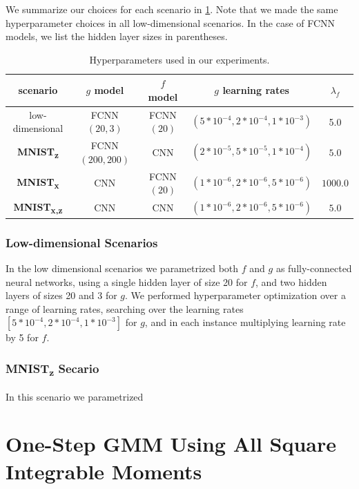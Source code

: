 \documentclass{article}
\theoremstyle{plain}
\theoremstyle{definition}
\newcommand\mnist[1]{\textbf{MNIST\textsubscript{#1}}}
\begin{document}
We summarize our choices for each scenario in \cref{tab:hyperparameters}. Note that we made the same hyperparameter choices in all low-dimensional scenarios. In the case of FCNN models, we list the hidden layer sizes in parentheses. 

\begin{table}
    \begin{tabular}{ccccc}
        \hline
        scenario & $g$ model & $f$ model & $g$ learning rates & $\lambda_f$ \\
        \hline
        low-dimensional & FCNN $(20,3)$ & FCNN $(20)$ & $(5 * 10^{-4}, 2 * 10^{-4}, 1 * 10^{-3})$ & 5.0 \\
        \mnist{z} & FCNN $(200,200)$ & CNN & $(2 * 10^{-5}, 5 * 10^{-5}, 1 * 10^{-4})$ & $5.0$ \\
        \mnist{x} & CNN & FCNN $(20)$ & $(1 * 10^{-6}, 2 * 10^{-6}, 5 * 10^{-6})$ & $1000.0$ \\
        \mnist{x,z} & CNN & CNN & $(1 * 10^{-6}, 2 * 10^{-6}, 5 * 10^{-6})$ & $5.0$ \\
        \hline
    \end{tabular}
    \caption{Hyperparameters used in our experiments.}
    \label{tab:hyperparameters}
\end{table}

\subsubsection{Low-dimensional Scenarios}

In the low dimensional scenarios we parametrized both $f$ and $g$ as fully-connected neural networks, using a single hidden layer of size 20 for $f$, and two hidden layers of sizes 20 and 3 for $g$. We performed hyperparameter optimization over a range of learning rates, searching over the learning rates $[5 * 10^{-4}, 2 * 10^{-4}, 1 * 10^{-3}]$ for $g$, and in each instance multiplying learning rate by 5 for $f$.

\subsubsection{\mnist{z} Secario}

In this scenario we parametrized 

\section{One-Step GMM Using All Square Integrable Moments}
\label{apx:gmm-l2}
\end{document}
